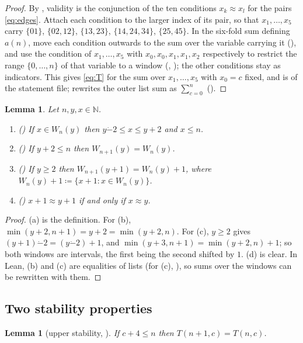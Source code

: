\documentclass[11pt]{amsart}
\theoremstyle{plain}
\newtheorem{lemma}[theorem]{Lemma}
\theoremstyle{definition}
\newcommand{\N}{\mathbb{N}}
\newcommand{\nr}{\approx}
\newcommand{\monus}{\mathbin{\dot{-}}}
\begin{document}
\begin{proof}
By , validity is the conjunction of the ten conditions $x_k\nr x_l$ for the pairs \eqref{eq:edges}. Attach each condition to the larger index of its pair, so that $x_1,\dots,x_5$ carry $\{01\}$, $\{02,12\}$, $\{13,23\}$, $\{14,24,34\}$, $\{25,45\}$. In the six-fold sum defining $a(n)$, move each condition outwards to the sum over the variable carrying it (), and use the condition of $x_1,\dots,x_5$ with $x_0,x_0,x_1,x_1,x_2$ respectively to restrict the range $\{0,\dots,n\}$ of that variable to a window (, ); the other conditions stay as indicators. This gives \eqref{eq:T} for the sum over $x_1,\dots,x_5$ with $x_0=c$ fixed, and is  of the statement file;  rewrites the outer list sum as $\sum_{c=0}^n$ ().
\end{proof}

\begin{lemma}\label{lem:win}
Let $n,y,x\in\N$.
\begin{enumerate}
\item[(a)] \textup{()} If $x\in W_n(y)$ then $y\monus2\le x\le y+2$ and $x\le n$.
\item[(b)] \textup{()} If $y+2\le n$ then $W_{n+1}(y)=W_n(y)$.
\item[(c)] \textup{()} If $y\ge2$ then $W_{n+1}(y+1)=W_n(y)+1$, where $W_n(y)+1\coloneqq\{x+1: x\in W_n(y)\}$.
\item[(d)] \textup{()} $x+1\nr y+1$ if and only if $x\nr y$.
\end{enumerate}
\end{lemma}

\begin{proof}
(a) is the definition. For (b), $\min(y+2,n+1)=y+2=\min(y+2,n)$. For (c), $y\ge2$ gives $(y+1)\monus2=(y\monus2)+1$, and $\min(y+3,n+1)=\min(y+2,n)+1$; so both windows are intervals, the first being the second shifted by $1$. (d) is clear. In Lean, (b) and (c) are equalities of lists (for (c), ), so sums over the windows can be rewritten with them.
\end{proof}

\subsection{Two stability properties}

\begin{lemma}[upper stability, ]\label{lem:up}
If $c+4\le n$ then $T(n+1,c)=T(n,c)$.
\end{lemma}
\end{document}
